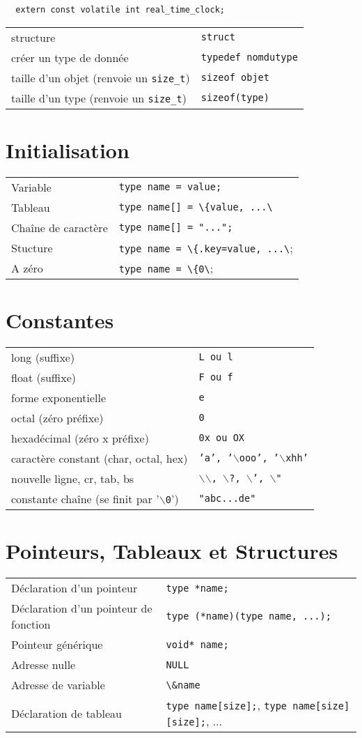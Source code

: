 \documentclass{article}
\newcommand{\key}[2]{#1 &\texttt{#2} \\ }
\newcommand{\bs}{$\backslash$}
\newenvironment{keylist}
     {\noindent\begin{tabular*}{\linewidth}{ll}} %
     {\end{tabular*}}
\newcommand{\cd}{\lstinline}
\begin{document}
\begin{multicols*}{3}
\begin{lstlisting}
  extern const volatile int real_time_clock;
\end{lstlisting}

\begin{keylist}

\key{structure}{struct}
\key{créer un type de donnée}{typedef \texttt{nomdutype}}
\key{taille d'un objet (renvoie un \texttt{size\_t})}{sizeof \texttt{objet}}
\key{taille d'un type (renvoie un \texttt{size\_t})}{sizeof(\texttt{type)}}
\end{keylist}

\section*{Initialisation}
\begin{tabularx}{\linewidth}{Xl}
  Variable & \cd{type name = value;} \\
  Tableau & \cd{type name[] = \{value, ...\}}; \\
  Chaîne de caractère & \cd{type name[] = "...";} \\
  Stucture & \cd{type name = \{.key=value, ...\};} \\
  A zéro & \cd{type name = \{0\};} \\
\end{tabularx}

\section*{Constantes}
\begin{keylist}
\key{long (suffixe)}{L \textrm{ou} l}
\key{float (suffixe)}{F \textrm{ou} f}
\key{forme exponentielle}{e}
\key{octal (zéro préfixe)}{0}
\key{hexadécimal (zéro x préfixe)}{0x \textrm{ou} OX}
\key{caractère constant (char, octal, hex)}{'a', '\bs\texttt{ooo}', '\bs{}x\texttt{hh}'}
\key{nouvelle ligne, cr, tab, bs}{\bs\bs{}, \bs?, \bs', \bs"}
\key{constante chaîne (se finit par '\texttt{\bs{}0}')}{"abc...de"}
\end{keylist}

\section*{Pointeurs, Tableaux et Structures}
\begin{tabularx}{\linewidth}{Xl}
  Déclaration d'un pointeur & \cd{type *name;} \\
  Déclaration d'un pointeur de fonction & \cd{type (*name)(type name, ...);} \\
  Pointeur générique & \cd{void* name;} \\
  Adresse nulle & \cd{NULL} \\
  Adresse de variable & \cd{\&name} \\
  Déclaration de tableau & \cd{type name[size];}, \cd{type name[size][size];}, ... \\
\end{tabularx}


\end{multicols*}
\end{document}
